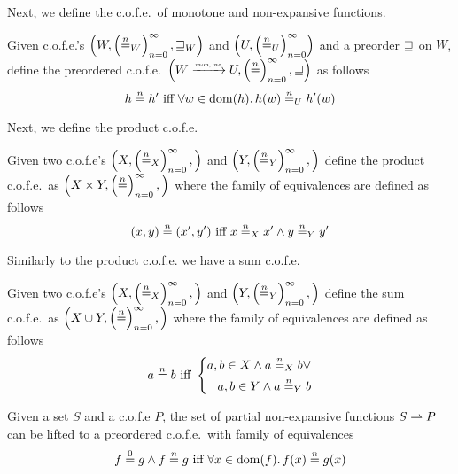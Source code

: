 \begin{jversion}
Next, we define the c.o.f.e.\ of monotone and non-expansive functions.
\begin{lemma}
  Given c.o.f.e.'s $\left(W,\left(\nequal[n]_W\right)_{n=0}^{\infty}, \future_W\right)$ and $\left(U,\left(\nequal[n]_U\right)_{n=0}^{\infty}\right)$ and a preorder $\future$ on $W$, define the preordered c.o.f.e.\ $\left(W \monnefun U,\left(\nequal[n]\right)_{n=0}^{\infty}, \future \right)$ as follows 
  \[
    h \nequal h' \text{ iff } \forall w \in \dom(h) \ldotp h(w) \nequal_U h'(w)
  \]
\end{lemma}
Next, we define the product c.o.f.e.
\begin{lemma}[Product c.o.f.e.]
  Given two c.o.f.e's $\left(X, \left(\nequal_X\right)_{n=0}^{\infty}, \right)$ and $\left(Y, \left(\nequal_Y\right)_{n=0}^{\infty}, \right)$ define the product c.o.f.e.\ as $\left(X \times Y, \left(\nequal\right)_{n=0}^{\infty}, \right)$
  where the family of equivalences are defined as follows
  \[
    (x,y) \nequal (x',y') \text{ iff } x \nequal_X x' \wedge y \nequal_Y y'
  \]
\end{lemma}
Similarly to the product c.o.f.e. we have a sum c.o.f.e.
\begin{lemma}[Sum c.o.f.e.]
  Given two c.o.f.e's $\left(X, \left(\nequal_X\right)_{n=0}^{\infty}, \right)$ and $\left(Y, \left(\nequal_Y\right)_{n=0}^{\infty}, \right)$ define the sum c.o.f.e.\ as $\left(X \cup Y, \left(\nequal\right)_{n=0}^{\infty}, \right)$
  where the family of equivalences are defined as follows
  \[
    a \nequal b \text{ iff }
    \left\{
      \begin{aligned}
        a,b \in X \wedge a \nequal_X b \vee \\
        a,b \in Y \wedge a \nequal_Y b
      \end{aligned}
    \right.
  \]
\end{lemma}
\begin{lemma}
  Given a set $S$ and a c.o.f.e $P$, the set of partial non-expansive functions $S \parfun P$ can be lifted to a preordered c.o.f.e.\ with family of equivalences
  \[
    f \nequal[0] g \wedge f \nequal g \text{ iff } \forall x \in \dom(f) \ldotp f(x) \nequal g(x)
  \]
\end{lemma}


\end{jversion}
